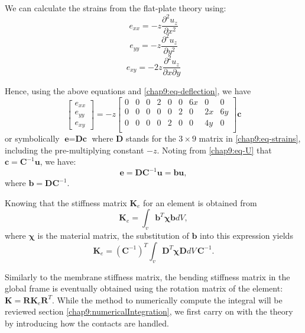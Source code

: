 \noindent We can calculate the strains from the flat-plate theory using:
\begin{equation}
e_{xx} = -z \frac{\partial^2u_z}{\partial x^2}
\end{equation} 
\begin{equation}
e_{yy} = -z \frac{\partial^2u_z}{\partial y^2}
\end{equation} 
\begin{equation}
e_{xy} = -2z \frac{\partial^2u_z}{\partial x \partial y}
\end{equation} 

\noindent Hence, using the above equations and \eqref{chap9:eq-deflection}, we have
\begin{equation}
\begin{bmatrix}
e_{xx} \\
e_{yy} \\
e_{xy}
\end{bmatrix}
= 
-z
\begin{bmatrix}
0 & 0 & 0 & 2 & 0 & 0 & 6x & 0 & 0 \\
0 & 0 & 0 & 0 & 0 & 2 & 0 & 2x & 6y \\
0 & 0 & 0 & 0 & 2 & 0 & 0 & 4y & 0 \\
\end{bmatrix}
\textbf{c}
\label{chap9:eq-strains}
\end{equation} 
or symbolically $\textbf{e} = \textbf{Dc}$ where $\textbf{D}$ stands for the $3\times 9$ matrix in \eqref{chap9:eq-strains}, including the pre-multiplying constant $-z$. Noting from \eqref{chap9:eq-U} that $\textbf{c} = \textbf{C}^{-1}\textbf{u}$, we have:
\begin{equation}
\textbf{e} = \textbf{DC}^{-1}\textbf{u} = \textbf{bu},
\end{equation} 
where $\textbf{b} = \textbf{DC}^{-1}$. 

\noindent Knowing that the stiffness matrix $\textbf{K}_e$ for an element is obtained from
\begin{equation}
\textbf{K}_e = \int_v \textbf{b}^{T} \boldsymbol\chi \textbf{b} dV,
\end{equation} 
where $\boldsymbol\chi$ is the material matrix, the substitution of $\textbf{b}$ into this expression yields
\begin{equation}
\label{chap9:Ke}
\textbf{K}_e = (\textbf{C}^{-1})^T \int_v \textbf{D}^{T} \boldsymbol\chi \textbf{D} dV \, \textbf{C}^{-1}.
\end{equation} 

Similarly to the membrane stiffness matrix, the bending stiffness matrix in the global frame is eventually obtained using the rotation matrix of the element: $\textbf{K} = \textbf{R} \textbf{K}_e \textbf{R}^{T}$. While the method to numerically compute the integral will be reviewed section \ref{chap9:numericalIntegration}, we first carry on with the theory by introducing how the contacts are handled.  



